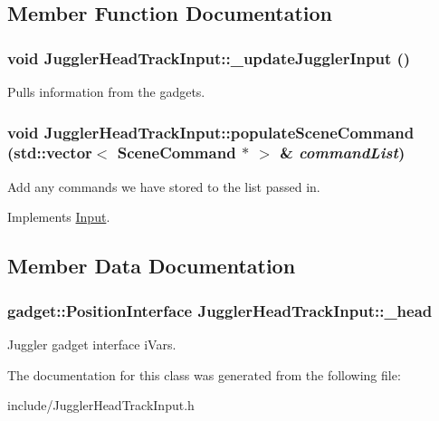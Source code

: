 \subsection{Member Function Documentation}
\hypertarget{class_juggler_head_track_input_a34f56d956372b53ad138b16965da1836}{
\subsubsection[{\_\-updateJugglerInput}]{\setlength{\rightskip}{0pt plus 5cm}void JugglerHeadTrackInput::\_\-updateJugglerInput ()}}
\label{class_juggler_head_track_input_a34f56d956372b53ad138b16965da1836}
Pulls information from the gadgets. \hypertarget{class_juggler_head_track_input_abb40712fe1e84f4172e883645bd0f1b8}{
\subsubsection[{populateSceneCommand}]{\setlength{\rightskip}{0pt plus 5cm}void JugglerHeadTrackInput::populateSceneCommand (std::vector$<$ {\bf SceneCommand} $\ast$ $>$ \& {\em commandList})}}
\label{class_juggler_head_track_input_abb40712fe1e84f4172e883645bd0f1b8}
Add any commands we have stored to the list passed in. 

Implements \hyperlink{class_input_ab927e3b2f1735052f6f1ef3f3bf7b29c}{Input}.

\subsection{Member Data Documentation}
\hypertarget{class_juggler_head_track_input_accbcc9cc4abeefa75a8c918484222386}{
\subsubsection[{\_\-head}]{\setlength{\rightskip}{0pt plus 5cm}gadget::PositionInterface {\bf JugglerHeadTrackInput::\_\-head}}}
\label{class_juggler_head_track_input_accbcc9cc4abeefa75a8c918484222386}
Juggler gadget interface iVars. 

The documentation for this class was generated from the following file:\begin{DoxyCompactItemize}
\item 
include/JugglerHeadTrackInput.h\end{DoxyCompactItemize}
